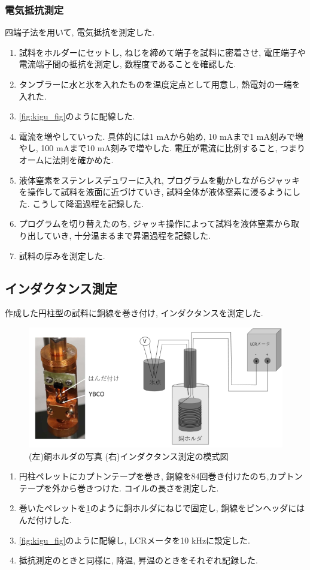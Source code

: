\documentclass[11pt]{ltjsarticle}
\begin{document}
    \subsubsection*{電気抵抗測定}
      四端子法を用いて, 電気抵抗を測定した.
      \begin{enumerate}
        \item 試料をホルダーにセットし, ねじを締めて端子を試料に密着させ, 電圧端子や電流端子間の抵抗を測定し, 数\Omega 程度であることを確認した.
        \item タンブラーに水と氷を入れたものを温度定点として用意し, 熱電対の一端を入れた. 
        \item \cref{fig:kigu_fig}のように配線した. 
        \item 電流を増やしていった. 具体的には1 mAから始め, 10 mAまで1 mA刻みで増やし, 100 mAまで10 mA刻みで増やした. 電圧が電流に比例すること, つまりオームに法則を確かめた. 
        \item 液体窒素をステンレスデュワーに入れ, プログラムを動かしながらジャッキを操作して試料を液面に近づけていき, 試料全体が液体窒素に浸るようにした. こうして降温過程を記録した.
        \item プログラムを切り替えたのち, ジャッキ操作によって試料を液体窒素から取り出していき, 十分温まるまで昇温過程を記録した.
        \item 試料の厚みを測定した.
      \end{enumerate}
    \subsection*{インダクタンス測定}
      作成した円柱型の試料に銅線を巻き付け, インダクタンスを測定した.
      \begin{figure}
        \centering
        \includegraphics[width=0.6\columnwidth]{Lsokutei.png}
        \caption{(左)銅ホルダの写真 (右)インダクタンス測定の模式図}
        \label{fig:inductor}
      \end{figure}
      \begin{enumerate}
        \item 円柱ペレットにカプトンテープを巻き, 銅線を84回巻き付けたのち,カプトンテープを外から巻きつけた. コイルの長さを測定した.
        \item 巻いたペレットを\cref{fig:inductor}のように銅ホルダにねじで固定し, 銅線をピンヘッダにはんだ付けした. 
        \item \cref{fig:kigu_fig}のように配線し, LCRメータを10 kHzに設定した.
        \item 抵抗測定のときと同様に, 降温, 昇温のときをそれぞれ記録した.
      \end{enumerate}
\end{document}
